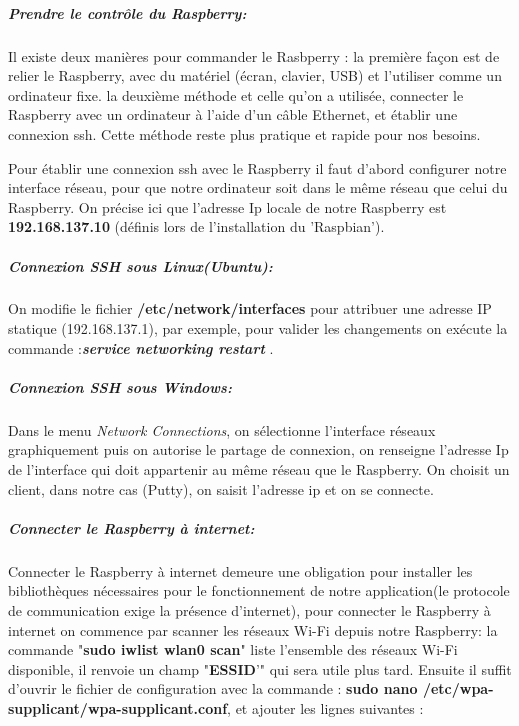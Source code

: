 \documentclass[12pt,a4paper]{article}
\begin{document}
\subparagraph {Prendre le contrôle du Raspberry:}
Il existe deux manières pour commander le Rasbperry : 
la première façon est de relier le Raspberry, avec du matériel (écran, clavier, USB) et l'utiliser comme un ordinateur fixe.
la deuxième méthode et celle qu'on a utilisée, connecter le Raspberry avec un ordinateur à l'aide d'un câble Ethernet, et établir une connexion ssh. Cette méthode reste plus pratique et rapide pour nos besoins.\par 

Pour établir une connexion ssh avec le Raspberry il faut d'abord configurer notre interface réseau, pour que notre ordinateur soit dans le même réseau que celui du Raspberry.
On précise ici que l'adresse Ip locale de notre Raspberry est \textbf{192.168.137.10} (définis lors de l'installation du 'Raspbian').\par 
\subparagraph{Connexion SSH sous Linux(Ubuntu):}On modifie le fichier \textbf{/etc/network/interfaces} pour attribuer une adresse IP statique (192.168.137.1), par exemple, pour valider les changements on exécute la commande :\textit{\textbf{service networking restart }}
.\par 

\subparagraph{Connexion SSH sous Windows:} Dans le menu \textit{Network Connections}, on sélectionne l'interface réseaux graphiquement puis on autorise le partage de connexion, on renseigne l'adresse Ip de l'interface qui doit appartenir au même réseau que le Raspberry. 
On choisit un client, dans notre cas (Putty), on saisit l'adresse ip  et on se connecte.\par

\subparagraph{Connecter le Raspberry à internet:} Connecter le Raspberry à internet demeure une obligation pour installer les bibliothèques nécessaires pour le fonctionnement de notre application(le protocole de communication exige la présence d'internet), pour connecter le Raspberry à internet on commence par scanner les réseaux Wi-Fi depuis notre Raspberry: la commande "\textbf{sudo iwlist wlan0 scan}" liste l'ensemble des réseaux Wi-Fi disponible, il renvoie un champ "\textbf{ESSID}'" qui sera utile plus tard. Ensuite il suffit d'ouvrir le fichier de configuration avec la commande : \textbf{sudo nano /etc/wpa-supplicant/wpa-supplicant.conf}, et ajouter les lignes suivantes :
\end{document}
